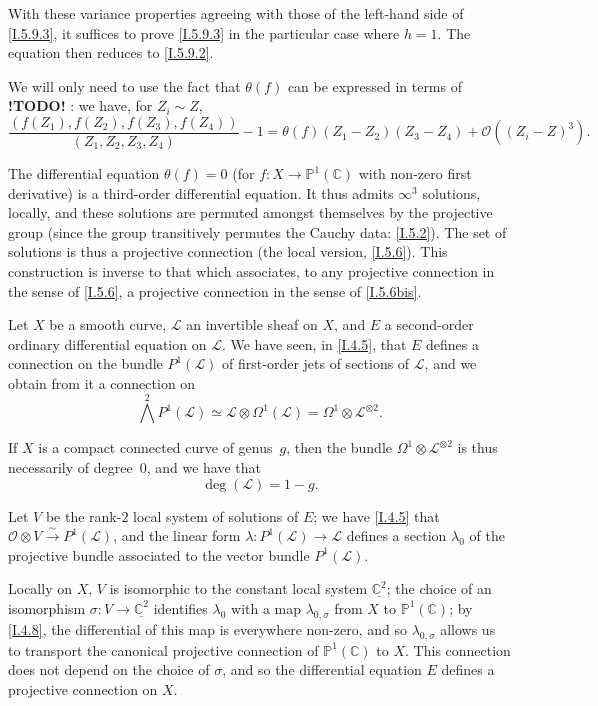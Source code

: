 \documentclass{report}
\theoremstyle{plain}
\theoremstyle{definition}
\newenvironment{env}[1]
    {\renewcommand\theinnercustomenv{#1}\innercustomenv}
    {\endinnercustomenv}
\newcommand{\sh}[1]{{\mathscr{#1}}}
\newcommand{\PP}{\mathbb{P}}
\newcommand{\CC}{\mathbb{C}}
\newcommand{\todo}{\textbf{ !TODO! }}
\newcommand{\oldpage}[1]{\marginpar{\footnotesize$\Big\vert$ \textit{p.~#1}}}
\begin{document}
\begin{env}{5.9}
\begin{enumerate}[(i)]
      With these variance properties agreeing with those of the left-hand side of \cref{I.5.9.3}, it suffices to prove \cref{I.5.9.3} in the particular case where $h=1$.
      The equation then reduces to \cref{I.5.9.2}.
  \end{enumerate}

  We will only need to use the fact that $\theta(f)$ can be expressed in terms of \todo:
  we have, for $Z_i\sim Z$,
  \[
  \label{I.5.9.4}
    \frac{(f(Z_1),f(Z_2),f(Z_3),f(Z_4))}{(Z_1,Z_2,Z_3,Z_4)} - 1
    = \theta(f)(Z_1-Z_2)(Z_3-Z_4) + \mathcal{O}((Z_i-Z)^3).
  \tag{5.9.4}
  \]
\end{env}

\oldpage{35}
\begin{env}{5.10}
\label{I.5.10}
  The differential equation $\theta(f)=0$ (for $f\colon X\to\PP^1(\CC)$ with non-zero first derivative) is a third-order differential equation.
  It thus admits $\infty^3$ solutions, locally, and these solutions are permuted amongst themselves by the projective group (since the group transitively permutes the Cauchy data: \cref{I.5.2}).
  The set of solutions is thus a projective connection (the local version, \cref{I.5.6}).
  This construction is inverse to that which associates, to any projective connection in the sense of \cref{I.5.6}, a projective connection in the sense of \cref{I.5.6bis}.
\end{env}

\begin{env}{5.11}
\label{I.5.11}
  Let $X$ be a smooth curve, $\sh{L}$ an invertible sheaf on $X$, and $E$ a second-order ordinary differential equation on $\sh{L}$.
  We have seen, in \cref{I.4.5}, that $E$ defines a connection on the bundle $P^1(\sh{L})$ of first-order jets of sections of $\sh{L}$, and we obtain from it a connection on
  \[
    \bigwedge^2 P^1(\sh{L}) \simeq \sh{L}\otimes\Omega^1(\sh{L}) = \Omega^1\otimes\sh{L}^{\otimes2}.
  \]

  If $X$ is a compact connected curve of genus~$g$, then the bundle $\Omega^1\otimes\sh{L}^{\otimes2}$ is thus necessarily of degree~$0$, and we have that
  \[
    \deg(\sh{L}) = 1-g.
  \]

  Let $V$ be the rank-$2$ local system of solutions of $E$;
  we have \cref{I.4.5} that $\sh{O}\otimes V\xrightarrow{\sim}P^1(\sh{L})$, and the linear form $\lambda\colon P^1(\sh{L})\to\sh{L}$ defines a section $\lambda_0$ of the projective bundle associated to the vector bundle $P^1(\sh{L})$.

  Locally on $X$, $V$ is isomorphic to the constant local system $\underline{\CC^2}$;
  the choice of an isomorphism $\sigma\colon V\to\underline{\CC^2}$ identifies $\lambda_0$ with a map $\lambda_{0,\sigma}$ from $X$ to $\PP^1(\CC)$;
  by \cref{I.4.8}, the differential of this map is everywhere non-zero, and so $\lambda_{0,\sigma}$ allows us to transport the canonical projective connection of $\PP^1(\CC)$ to $X$.
  This connection does not depend on the choice of $\sigma$, and so the differential equation $E$ defines a projective connection on $X$.
\end{env}
\end{document}
